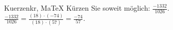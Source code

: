 \begin{MAufgabe}{Kuerzen}{kr, MaTeX}
K\"urzen Sie soweit m\"oglich: $\frac{-1332}{1026}$.\\ 
\ifLsg\MLoesung
\quad $\frac{-1332}{1026}=\frac{(18)\cdot(-74)}{(18)\cdot(57)}=\frac{-74}{57}$.\else\relax\fi
 \end{MAufgabe}